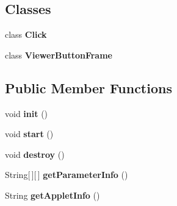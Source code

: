 \subsection*{Classes}
\begin{DoxyCompactItemize}
\item 
class {\bfseries Click}
\item 
class {\bfseries Viewer\-Button\-Frame}
\end{DoxyCompactItemize}
\subsection*{Public Member Functions}
\begin{DoxyCompactItemize}
\item 
void {\bfseries init} ()\label{classdesmoj_1_1extensions_1_1visualization2d_1_1engine_1_1viewer_1_1_viewer_button_applet_a4a69c31101f26eadcacb2b7c44d30b06}

\item 
void {\bfseries start} ()\label{classdesmoj_1_1extensions_1_1visualization2d_1_1engine_1_1viewer_1_1_viewer_button_applet_ab803834aaeb8cc7d23db0305535164ad}

\item 
void {\bfseries destroy} ()\label{classdesmoj_1_1extensions_1_1visualization2d_1_1engine_1_1viewer_1_1_viewer_button_applet_a6ee2c07b0688ea2c29e831f8a7132aa4}

\item 
String[$\,$][$\,$] {\bfseries get\-Parameter\-Info} ()\label{classdesmoj_1_1extensions_1_1visualization2d_1_1engine_1_1viewer_1_1_viewer_button_applet_a7a6b5b84022b81dc89c713d422cbb87a}

\item 
String {\bfseries get\-Applet\-Info} ()\label{classdesmoj_1_1extensions_1_1visualization2d_1_1engine_1_1viewer_1_1_viewer_button_applet_a1988a39047e37b30a026652e5418823c}

\end{DoxyCompactItemize}


